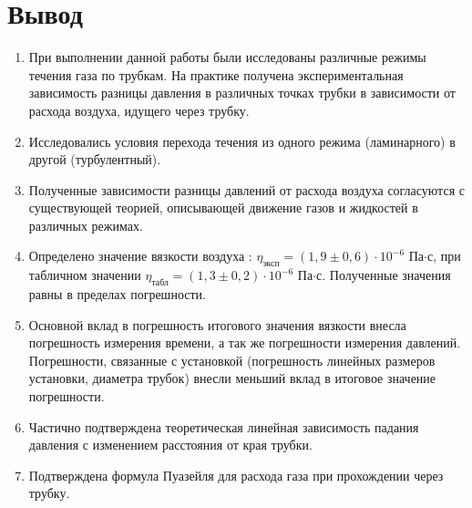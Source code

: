 \documentclass[11pt,a4paper]{article}
\begin{document}
\section{Вывод}

\begin{enumerate}
	\item При выполнении данной работы были исследованы различные режимы течения газа по трубкам. На практике получена экспериментальная зависимость разницы давления в различных точках трубки в зависимости от расхода воздуха, идущего через трубку.
	\item Исследовались условия перехода течения из одного режима (ламинарного) в другой (турбулентный).
	\item Полученные зависимости разницы давлений от расхода воздуха согласуются с существующей теорией, описывающей движение газов и жидкостей в различных режимах.
	\item Определено значение вязкости воздуха : $\eta_{\text{эксп}} = \left(1,9 \pm 0,6\right) \cdot 10^{-6}$ Па$\cdot$с, при табличном значении $\eta_{\text{табл}} = \left(1,3 \pm 0,2\right) \cdot 10^{-6}$ Па$\cdot$с. Полученные значения равны в пределах погрешности.
	\item Основной вклад в погрешность итогового значения вязкости внесла погрешность измерения времени, а так же погрешности измерения давлений. Погрешности, связанные с установкой (погрешность линейных размеров установки, диаметра трубок) внесли меньший вклад в итоговое значение погрешности.
	\item Частично подтверждена теоретическая линейная зависимость падания давления с изменением расстояния от края трубки.
	\item Подтверждена формула Пуазейля для расхода газа при прохождении через трубку.
\end{enumerate}
\end{document}
